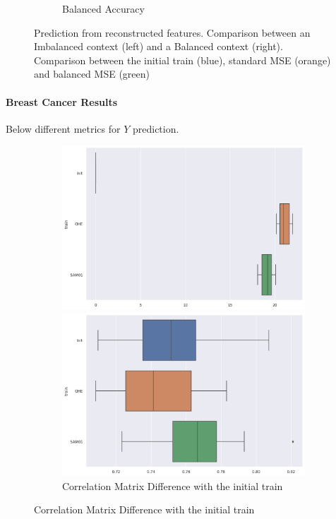 \documentclass{article}
\theoremstyle{definition}
\begin{document}
\begin{figure}[H]
\begin{subfigure}[b]{0.24\textwidth}
         \caption{Balanced Accuracy}
         \label{Prediction_Adults_Bal2}
     \end{subfigure}
     \caption{Prediction from reconstructed features. Comparison between an Imbalanced context (left) and a Balanced context (right). Comparison between the initial train (blue), standard MSE (orange) and balanced MSE (green)}
     \label{Prediction_Adults2}
\end{figure}

\newpage
\paragraph{Breast Cancer Results} Below different metrics for $Y$ prediction.

\begin{figure}[H]
     \centering
     \begin{subfigure}[b]{0.24\textwidth}
         \centering
         \includegraphics[width=\textwidth]{imgs/BreastCancer/Imb/Boxplot_MC.png}
         \caption{Correlation Matrix Difference with the initial train}
         \quad
         \includegraphics[width=\textwidth]{imgs/BreastCancer/Imb/Boxplot_AUC.png}

\end{subfigure}
\end{figure}
\end{document}
